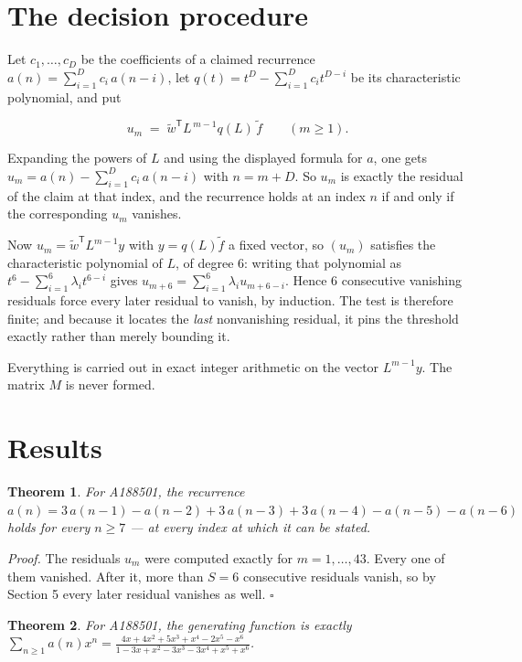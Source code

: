 \documentclass[11pt]{article}
\newtheorem{theorem}{Theorem}
\theoremstyle{definition}
\begin{document}
\section{The decision procedure}

Let $c_1,\dots,c_D$ be the coefficients of a claimed recurrence $a(n) = \sum_{i=1}^{D} c_i\,a(n-i)$, let $q(t) = t^{D} - \sum_{i=1}^{D} c_i t^{D-i}$ be its characteristic polynomial, and put

\[u_m \;=\; \tilde w^{\mathsf T} L^{\,m-1} q(L)\,\tilde f \qquad (m \ge 1).\]

Expanding the powers of $L$ and using the displayed formula for $a$, one gets $u_m = a(n) - \sum_{i=1}^{D} c_i\,a(n-i)$ with $n = m + D$. So $u_m$ is exactly the residual of the claim at that index, and the recurrence holds at an index $n$ if and only if the corresponding $u_m$ vanishes.

Now $u_m = \tilde w^{\mathsf T} L^{m-1} y$ with $y = q(L)\tilde f$ a fixed vector, so $(u_m)$ satisfies the characteristic polynomial of $L$, of degree $6$: writing that polynomial as $t^{6} - \sum_{i=1}^{6} \lambda_i t^{6-i}$ gives $u_{m+6} = \sum_{i=1}^{6} \lambda_i u_{m+6-i}$. Hence $6$ consecutive vanishing residuals force every later residual to vanish, by induction. The test is therefore finite; and because it locates the {\itshape last} nonvanishing residual, it pins the threshold exactly rather than merely bounding it.

Everything is carried out in exact integer arithmetic on the vector $L^{m-1}y$. The matrix $M$ is never formed.

\section{Results}

\begin{theorem} For A188501, the recurrence $a(n) = 3\,a(n-1) - a(n-2) + 3\,a(n-3) + 3\,a(n-4) - a(n-5) - a(n-6)$ holds for every $n \ge 7$ --- at every index at which it can be stated.\end{theorem}

{\itshape Proof.} The residuals $u_m$ were computed exactly for $m = 1,\dots,43$. Every one of them vanished. After it, more than $S = 6$ consecutive residuals vanish, so by Section 5 every later residual vanishes as well. $\square$

\begin{theorem} For A188501, the generating function is exactly $\sum_{n\ge 1} a(n)x^n = \frac{4x + 4x^{2} + 5x^{3} + x^{4} - 2x^{5} - x^{6}}{1 - 3x + x^{2} - 3x^{3} - 3x^{4} + x^{5} + x^{6}}$.\end{theorem}
\end{document}
